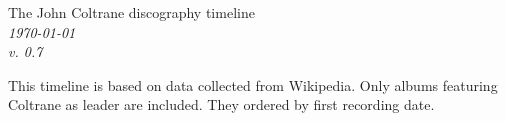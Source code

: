 \documentclass[a4paper, landscape]{article}
\newcounter{timelineend}
\newlength\legendx
\newcommand\makethelegend{
\small
    \node at (\legendx, 4.3) 
        [legend, anchor=north east] (recorddatelegend) 
        {First recording date} ;

    \node at (\legendx, 4.5) 
        [legend, anchor=south east, color=gray] 
        {Release year\\(if other than first rec.)};

    \node at (\legendx, 3.65) [legend, anchor=east] {*\,=\,live};

        \def\nodecolor{black}

    \node at (\legendx, 3.1) [anchor=east] {Album};

    \node at (\legendx, 2.8) [inner sep=1.5pt, legend, anchor=north east] (albumlegend) {Record label} ;

    \foreach \l/\c in 
        {Prestige/red,
        Blue~Note/blue,
        Savoy/violet,
        Atlantic/green,
        Pablo/black,
        Impulse!/orange}
        {
            \node at (albumlegend.south east) 
                [inner sep=1.5pt, legend, rounded corners, draw=\c!40, fill=\c!10, anchor=north east]
                (albumlegend) {\l\vphantom{jk}};
        }

        \node at (\legendx, -0.8cm) 
            [anchor=north east]
            {Personnel};

        \node at (\legendx,-3)
            [legend, anchor=east]
            {Other\\recording\\dates};
}
\begin{document}
\thispagestyle{empty}

\begin{minipage}[t]{.4\textwidth}
    {\huge The John Coltrane discography timeline}\\[\medskipamount]
    \textit{\today\\v. 0.7}
\end{minipage}
\hfill
\begin{minipage}[t]{.3\textwidth}
\large
This timeline is based on data collected from Wikipedia. Only albums featuring Coltrane as leader are included. They ordered by first recording date.
\end{minipage}


\vfill

\center


\end{document}
